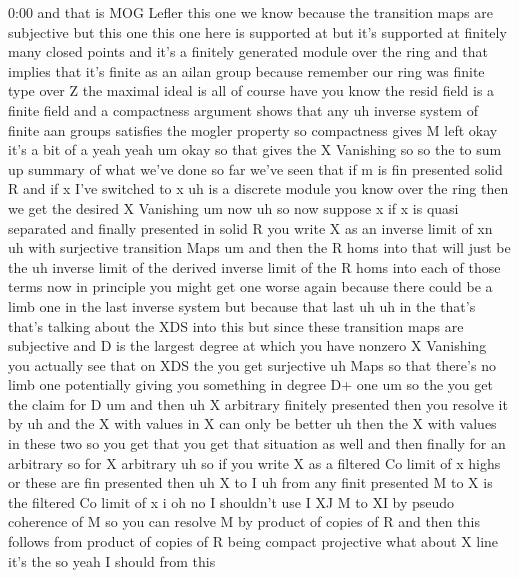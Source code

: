 \begin{unfinished}{0:00}
and  that  is  MOG  Lefler  this  one  we  know
because  the  transition  maps  are
subjective  but  this  one  this  one  here  is
supported  at  but  it's  supported  at
finitely  many  closed
points  and  it's  a  finitely  generated
module  over  the  ring  and  that  implies
that  it's  finite  as  an  ailan
group  because  remember  our  ring  was
finite  type  over  Z  the  maximal  ideal  is
all  of  course  have  you  know  the  resid
field  is  a  finite  field  and  a
compactness  argument  shows  that  any  uh
inverse  system  of  finite  aan  groups
satisfies  the  mogler  property  so
compactness  gives  M
left
okay  it's  a  bit  of  a
yeah
yeah
um  okay  so  that  gives  the  X  Vanishing  so
so  the  to  sum
up  summary  of  what  we've  done  so  far
we've  seen  that  if  m  is  fin
presented  solid  R  and  if  x  I've  switched
to  x  uh  is  a  discrete  module  you  know
over  the  ring  then  we  get  the  desired  X
Vanishing
um  now  uh  so  now  suppose
x  if  x  is  quasi  separated  and  finally
presented  in  solid
R  you  write  X  as  an  inverse  limit  of
xn  uh  with  surjective  transition
Maps
um  and  then  the  R  homs  into  that  will
just  be  the  uh  inverse  limit  of  the
derived  inverse  limit  of  the  R  homs  into
each  of  those  terms
now  in  principle  you  might  get  one  worse
again  because  there  could  be  a  limb  one
in  the  last  inverse  system  but  because
that  last  uh  uh  in  the  that's  that's
talking  about  the  XDS  into  this  but
since  these  transition  maps  are
subjective  and  D  is  the  largest  degree
at  which  you  have
nonzero  X  Vanishing  you  actually  see
that  on  XDS  the  you  get  surjective  uh
Maps  so  that  there's  no  limb  one
potentially  giving  you  something  in
degree  D+  one  um  so  the  you  get  the
claim  for
D  um  and  then  uh  X  arbitrary  finitely
presented  then  you  resolve  it  by
uh  and  the  X  with  values  in  X  can  only
be  better  uh  then  the  X  with  values  in
these  two  so  you  get  that  you  get  that
situation  as  well  and  then  finally  for
an
arbitrary  so  for  X
arbitrary  uh  so  if  you  write  X  as  a
filtered  Co  limit  of  x  highs  or  these
are  fin  presented  then  uh  X  to  I  uh  from
any  finit  presented  M  to  X  is  the
filtered  Co  limit  of  x  i  oh  no  I
shouldn't  use  I
XJ  M  to  XI  by  pseudo
coherence  of  M  so  you  can  resolve  M  by
product  of  copies  of  R  and  then  this
follows  from  product  of  copies  of  R
being  compact  projective  what  about  X
line  it's  the  so  yeah  I  should  from  this

\end{unfinished}
